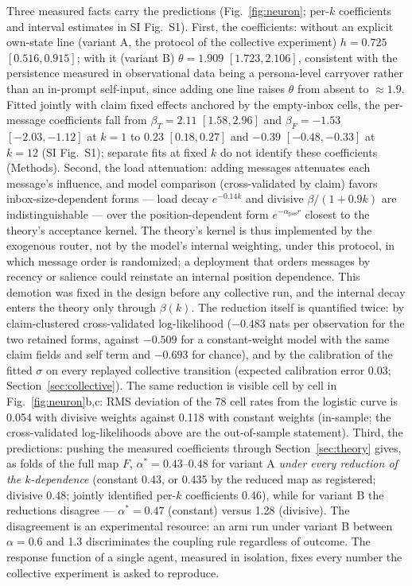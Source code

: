 \documentclass[11pt]{article}
\newcommand{\astar}{\alpha^{*}}
\begin{document}
Three measured facts carry the predictions (Fig.~\ref{fig:neuron}; per-$k$ coefficients and interval estimates in SI Fig.~S1). First,
the coefficients: without an explicit own-state line (variant A, the protocol
of the collective experiment) $h = 0.725$ $[0.516, 0.915]$; with it (variant
B) $\theta = 1.909$ $[1.723, 2.106]$, consistent with the persistence
measured in observational data being a persona-level carryover rather than an
in-prompt self-input, since adding one line raises $\theta$ from absent to
$\approx 1.9$. Fitted jointly with claim fixed effects anchored by the
empty-inbox cells, the per-message coefficients fall from
$\beta_T = 2.11$ $[1.58, 2.96]$ and $\beta_F = -1.53$ $[-2.03, -1.12]$ at
$k = 1$ to $0.23$ $[0.18, 0.27]$ and $-0.39$ $[-0.48, -0.33]$ at $k = 12$
(SI Fig.~S1); separate fits at fixed $k$ do not identify these coefficients
(Methods). Second, the load attenuation: adding messages attenuates each
message's influence, and model comparison (cross-validated by claim) favors
inbox-size-dependent forms --- load decay $e^{-0.14k}$ and divisive
$\beta/(1+0.9k)$ are indistinguishable --- over the position-dependent form
$e^{-\alpha_{\mathrm{pos}} r}$ closest to the theory's acceptance kernel. The
theory's kernel is thus implemented by the exogenous router, not by the
model's internal weighting, under this protocol, in which message order is
randomized; a deployment that orders messages by recency or salience could
reinstate an internal position dependence. This demotion was fixed in the design before any collective run, and the internal decay enters the theory only through $\beta(k)$. The reduction itself is quantified twice: by claim-clustered cross-validated log-likelihood ($-0.483$ nats per observation for the two retained forms, against $-0.509$ for a constant-weight model with the same claim fields and self term and $-0.693$ for chance), and by the calibration of the fitted $\sigma$ on every replayed collective transition (expected calibration error 0.03; Section~\ref{sec:collective}). The same reduction is visible cell by cell in Fig.~\ref{fig:neuron}b,c: RMS deviation of the 78 cell rates from the logistic curve is 0.054 with divisive weights against 0.118 with constant weights (in-sample; the cross-validated log-likelihoods above are the out-of-sample statement). Third, the
predictions: pushing the measured coefficients through
Section~\ref{sec:theory} gives, as folds of the full map $F$,
$\astar = 0.43$--$0.48$ for variant A \emph{under every reduction of the
$k$-dependence} (constant 0.43, or 0.435 by the reduced map as registered;
divisive 0.48; jointly identified per-$k$ coefficients 0.46), while for
variant B the reductions disagree ---
$\astar = 0.47$ (constant) versus 1.28 (divisive). The disagreement is
an experimental resource: an arm run under variant B between $\alpha = 0.6$
and 1.3 discriminates the coupling rule regardless of outcome. The response
function of a single agent, measured in isolation, fixes every number the
collective experiment is asked to reproduce.
\end{document}
